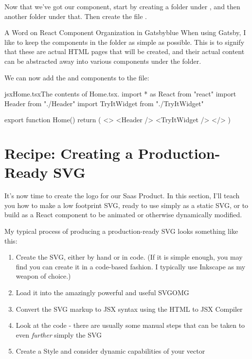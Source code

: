 \documentclass[paper=6in:9in,pagesize=pdftex,headinclude=on,footinclude=on,12pt]{scrbook}
\begin{document}

Now that we've got our  component, start by creating a  folder under  , and then another folder  under that. Then create the file .

\begin{highlightBox}{A Word on React Component Organization in Gatsby}{blue}{\information}
When using Gatsby, I like to keep the components in the  folder as simple as possible. This is to signify that these are actual HTML pages that will be created, and their actual content can be abstracted away into various components under the  folder.
\end{highlightBox}

We can now add the  and  components to the   file:

\begin{codeInput}{jsx}{Home.tsx}{The contents of Home.tsx.}
import * as React from "react"
import { Header } from "./Header"
import { TryItWidget } from "./TryItWidget"

export function Home() {
  return (
    <>
      <Header />
      <TryItWidget />
    </>
  )
}  
\end{codeInput}

\section{Recipe: Creating a Production-Ready SVG}

It's now time to create the logo for our Saas Product. In this section, I'll teach you how to make a low footprint SVG, ready to use simply as a static SVG, or to build as a React component to be animated or otherwise dynamically modified.

My typical process of producing a production-ready SVG looks something like this:

\begin{enumerate}
\item Create the SVG, either by hand or in code. (If it is simple enough, you may find you can create it in a code-based fashion. I typically use Inkscape as my weapon of choice.)
\item Load it into the amazingly powerful and useful SVGOMG
\item Convert the SVG markup to JSX syntax using the HTML to JSX Compiler
\item Look at the code - there are usually some manual steps that can be taken to even \textit{further} simply the SVG
\item Create a Style and consider dynamic capabilities of your vector
\end{enumerate}
\end{document}
